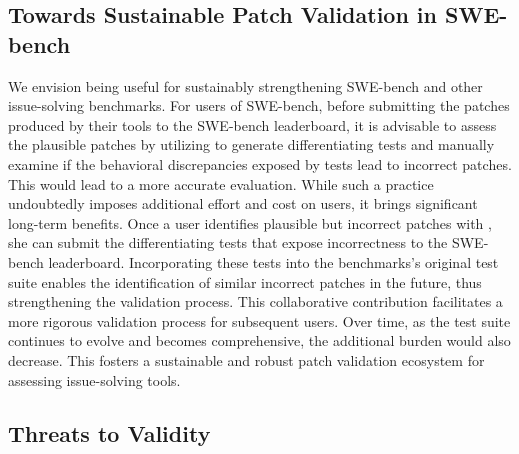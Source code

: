 \subsection{Towards Sustainable Patch Validation in SWE-bench}


We envision \appname being useful for sustainably strengthening SWE-bench and other issue-solving benchmarks.
For users of SWE-bench, 
before submitting the patches produced by their tools to the SWE-bench leaderboard, 
it is advisable to assess the plausible patches by utilizing \appname to generate differentiating tests and manually examine if the behavioral discrepancies exposed by tests lead to incorrect patches.
This would lead to a more accurate evaluation.
While such a practice undoubtedly imposes additional effort and cost on users, 
it brings significant long-term benefits. 
Once a user identifies plausible but incorrect patches with \appname, 
she can submit the differentiating tests that expose incorrectness to the SWE-bench leaderboard. 
Incorporating these tests into the benchmarks's original test suite enables the identification of similar incorrect patches in the future, thus strengthening the validation process.
This collaborative contribution facilitates a more rigorous validation process for subsequent users.
Over time, as the test suite continues to evolve and becomes comprehensive, the additional burden would also decrease. 
This fosters a sustainable and robust patch validation ecosystem for assessing issue-solving tools. 





\subsection{Threats to Validity}


